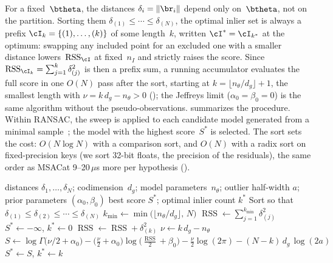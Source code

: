 \documentclass{article}
\DeclareMathOperator{\RSS}{RSS}
\newcommand{\mname}[1]{\texorpdfstring{#1\xspace}{#1}}
\newcommand{\ransac}{\mname{RANSAC}}
\newcommand{\msac}{\mname{MSAC}}
\begin{document}
For a fixed~$\btheta$, the distances $\delta_i = \|\br_i\|$
depend only on~$\btheta$, not on the partition.  Sorting them
$\delta_{(1)} \leq \cdots \leq \delta_{(N)}$, the optimal inlier set is
always a prefix $\cI_k = \{(1),\ldots,(k)\}$ of some length~$k$,
written $\cI^* = \cI_{k^*}$ at the optimum: swapping any
included point for an excluded one with a smaller distance
lowers~$\RSS_\cI$ at fixed~$n_I$ and strictly raises the score.
Since $\RSS_{\cI_k} = \sum_{j=1}^{k} \delta_{(j)}^2$ is then a prefix sum, a
running accumulator evaluates the full score in one $O(N)$ pass after
the sort, starting at $k = \lfloor n_\theta/d_g \rfloor + 1$, the smallest
length with
$\nu = k\,d_g - n_\theta > 0$ (); the Jeffreys limit ($\alpha_0{=}\beta_0{=}0$) is the
same algorithm without the pseudo-observations.
 summarizes the
procedure.  Within \ransac, the
sweep is applied to each candidate model generated from a
minimal sample~\cite{Fischler1981}; the model with the highest
score~$S^*$ is selected.  The sort sets the cost: $O(N\log N)$ with
a comparison sort, and $O(N)$ with a radix sort on fixed-precision
keys (we sort 32-bit floats, the precision of the residuals), the
same order as \msac at 9--20\,$\mu$s more per hypothesis
().

\begin{algorithm}[h]
	\caption{Sort-and-sweep computation of the
		profile-marginal score~\eqref{eq:profile-I}, using~\eqref{eq:score}.
		The algorithm returns the best-scoring prefix
		$\cI^* = \{(1),\ldots,(k^*)\}$ with one sort and an $O(N)$ sweep.}
	\label{alg:score}
	\begin{algorithmic}[1]
		\Require distances
		$\delta_1,\ldots,\delta_N$;
		codimension~$d_g$;
		model parameters~$n_\theta$;
		outlier half-width $a$;
		prior parameters $(\alpha_0, \beta_0)$
		\Ensure best score $S^*$; optimal inlier count $k^*$
		\State Sort so that
		$\delta_{(1)} \leq \delta_{(2)} \leq \cdots \leq \delta_{(N)}$
		\State $k_{\min} \gets \min\!\bigl(\lfloor n_\theta/d_g \rfloor,\, N\bigr)$
		\State $\RSS \gets \sum_{j=1}^{k_{\min}} \delta_{(j)}^2$
		\State $S^* \gets -\infty$, \quad $k^* \gets 0$
		\State $\RSS \gets \RSS + \delta_{(k)}^2$
		\State $\nu \gets k\,d_g - n_\theta$
		\State $S \gets \log\Gamma\!\bigl(\nu/2 + \alpha_0\bigr)
			- \bigl(\tfrac{\nu}{2}+\alpha_0\bigr)\log\!\bigl(\tfrac{\RSS}{2}+\beta_0\bigr)
			- \tfrac{\nu}{2}\log(2\pi)
			- (N{-}k)\,d_g\,\log(2a)$
		\State $S^* \gets S$, \quad $k^* \gets k$
		\EndIf
		\EndFor
	\end{algorithmic}
\end{algorithm}
\end{document}
